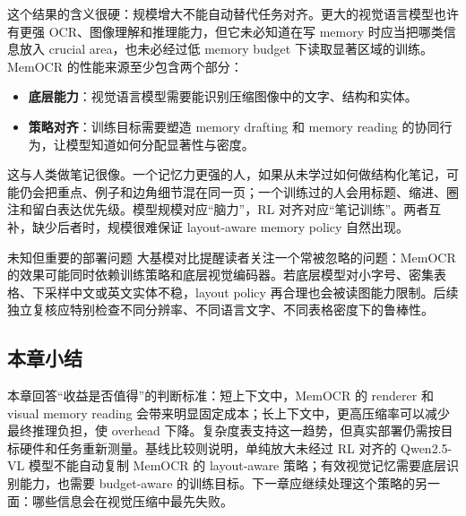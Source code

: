 这个结果的含义很硬：规模增大不能自动替代任务对齐。更大的视觉语言模型也许有更强 OCR、图像理解和推理能力，但它未必知道在写 memory 时应当把哪类信息放入 crucial area，也未必经过低 memory budget 下读取显著区域的训练。MemOCR 的性能来源至少包含两个部分：

\begin{itemize}
  \item \textbf{底层能力}：视觉语言模型需要能识别压缩图像中的文字、结构和实体。
  \item \textbf{策略对齐}：训练目标需要塑造 memory drafting 和 memory reading 的协同行为，让模型知道如何分配显著性与密度。
\end{itemize}

这与人类做笔记很像。一个记忆力更强的人，如果从未学过如何做结构化笔记，可能仍会把重点、例子和边角细节混在同一页；一个训练过的人会用标题、缩进、圈注和留白表达优先级。模型规模对应“脑力”，RL 对齐对应“笔记训练”。两者互补，缺少后者时，规模很难保证 layout-aware memory policy 自然出现。

\begin{knowledgebox}{未知但重要的部署问题}
大基模对比提醒读者关注一个常被忽略的问题：MemOCR 的效果可能同时依赖训练策略和底层视觉编码器。若底层模型对小字号、密集表格、下采样中文或英文实体不稳，layout policy 再合理也会被读图能力限制。后续独立复核应特别检查不同分辨率、不同语言文字、不同表格密度下的鲁棒性。
\end{knowledgebox}

\subsection{本章小结}

本章回答“收益是否值得”的判断标准：短上下文中，MemOCR 的 renderer 和 visual memory reading 会带来明显固定成本；长上下文中，更高压缩率可以减少最终推理负担，使 overhead 下降。复杂度表支持这一趋势，但真实部署仍需按目标硬件和任务重新测量。基线比较则说明，单纯放大未经过 RL 对齐的 Qwen2.5-VL 模型不能自动复制 MemOCR 的 layout-aware 策略；有效视觉记忆需要底层识别能力，也需要 budget-aware 的训练目标。下一章应继续处理这个策略的另一面：哪些信息会在视觉压缩中最先失败。
